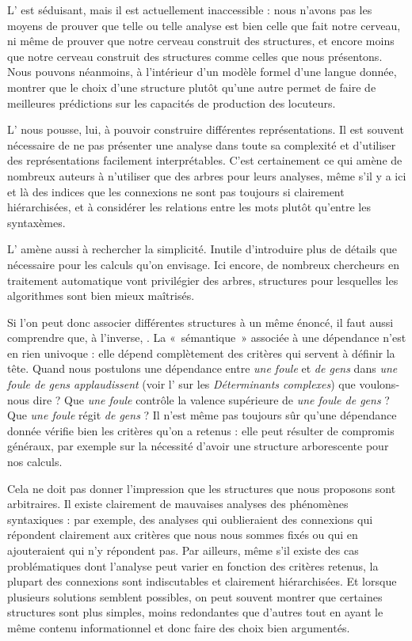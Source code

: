 L’ est séduisant, mais il est actuellement inaccessible : nous n’avons pas les moyens de prouver que telle ou telle analyse est bien celle que fait notre cerveau, ni même de prouver que notre cerveau construit des structures, et encore moins que notre cerveau construit des structures comme celles que nous présentons. Nous pouvons néanmoins, à l’intérieur d’un modèle formel d’une langue donnée, montrer que le choix d’une structure plutôt qu’une autre permet de faire de meilleures prédictions sur les capacités de production des locuteurs.

L’ nous pousse, lui, à pouvoir construire différentes représentations. Il est souvent nécessaire de ne pas présenter une analyse dans toute sa complexité et d’utiliser des représentations facilement interprétables. C’est certainement ce qui amène de nombreux auteurs à n’utiliser que des arbres pour leurs analyses, même s’il y a ici et là des indices que les connexions ne sont pas toujours si clairement hiérarchisées, et à considérer les relations entre les mots plutôt qu'entre les syntaxèmes.

L’ amène aussi à rechercher la simplicité. Inutile d’introduire plus de détails que nécessaire pour les calculs qu’on envisage. Ici encore, de nombreux chercheurs en traitement automatique vont privilégier des arbres, structures pour lesquelles les algorithmes sont bien mieux maîtrisés.

Si l’on peut donc associer différentes structures à un même énoncé, il faut aussi comprendre que, à l’inverse, . La «~sémantique~» associée à une dépendance n’est en rien univoque : elle dépend complètement des critères qui servent à définir la tête. Quand nous postulons une dépendance entre \textit{une foule} et \textit{de gens} dans \textit{une foule de gens applaudissent} (voir l’ sur les \textit{Déterminants complexes}) que voulons-nous dire ? Que \textit{une foule} contrôle la valence supérieure de \textit{une foule de gens} ? Que \textit{une foule} régit \textit{de gens} ? Il n’est même pas toujours sûr qu’une dépendance donnée vérifie bien les critères qu’on a retenus : elle peut résulter de compromis généraux, par exemple sur la nécessité d’avoir une structure arborescente pour nos calculs.

\begin{sloppypar}
Cela ne doit pas donner l’impression que les structures que nous proposons sont arbitraires. Il existe clairement de mauvaises analyses des phénomènes syntaxiques : par exemple, des analyses qui oublieraient des connexions qui répondent clairement aux critères que nous nous sommes fixés ou qui en ajouteraient qui n’y répondent pas. Par ailleurs, même s’il existe des cas problématiques dont l’analyse peut varier en fonction des critères retenus, la plupart des connexions sont indiscutables et clairement hiérarchisées. Et lorsque plusieurs solutions sem\-blent possibles, on peut souvent montrer que certaines structures sont plus simples, moins redondantes que d’autres tout en ayant le même contenu informationnel et donc faire des choix bien argumentés.
\end{sloppypar}

